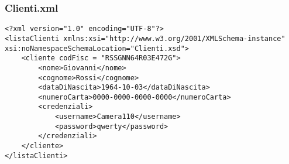 \documentclass [a4paper, 12pt]{book}
\begin{document}
\subsubsection{Clienti.xml}
\begin{lstlisting}[style=XML]
<?xml version="1.0" encoding="UTF-8"?>
<listaClienti xmlns:xsi="http://www.w3.org/2001/XMLSchema-instance" xsi:noNamespaceSchemaLocation="Clienti.xsd">
    <cliente codFisc = "RSSGNN64R03E472G">
        <nome>Giovanni</nome>
        <cognome>Rossi</cognome>
        <dataDiNascita>1964-10-03</dataDiNascita>
        <numeroCarta>0000-0000-0000-0000</numeroCarta>
        <credenziali>
            <username>Camera110</username>
            <password>qwerty</password>
        </credenziali>
    </cliente>
</listaClienti>

\end{lstlisting}
\end{document}
